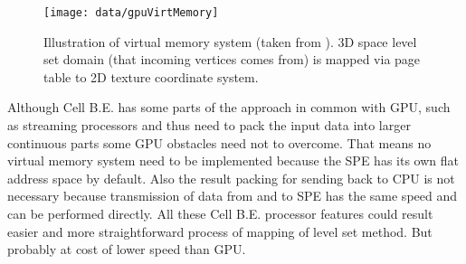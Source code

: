 \begin{figure}
    \centering
    \texttt{[image: data/gpuVirtMemory]}
    \caption[GPU virtual memory]{Illustration of virtual memory system (taken from \cite{lefonhGPUSolver}). 3D space level set domain (that incoming vertices comes from) is mapped via page table to 2D texture coordinate system.}
    \label{fg:virtual memory on GPU}
\end{figure}

\par
Although Cell B.E. has some parts of the approach in common with GPU, such as streaming processors and thus need to pack the input data into larger continuous parts some GPU obstacles need not to overcome.
That means no virtual memory system need to be implemented because the SPE has its own flat address space by default.
Also the result packing for sending back to CPU is not necessary because transmission of data from and to SPE has the same speed and can be performed directly.
All these Cell B.E. processor features could result easier and more straightforward process of mapping of level set method.
But probably at cost of lower speed than GPU.